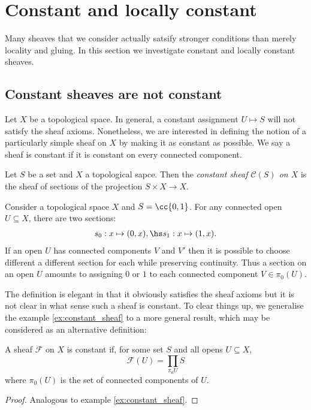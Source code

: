 \documentclass{article}
\begin{document}
\section{Constant and locally constant}\label{sec:locally_constant_sheaves}

Many sheaves that we consider actually satsify stronger conditions
than merely locality and gluing. In this section we investigate constant
and locally constant sheaves.

\subsection{Constant sheaves are not constant}

Let $X$ be a topological space. In general, a constant assignment
$U\mapsto S$ will not satisfy the sheaf axioms. Nonetheless,
we are interested in defining the notion of a particularly simple
sheaf on $X$ by making it as constant as possible. We say a sheaf
is constant if it is constant on every connected component.

\begin{definition}
  Let $S$ be a set and $X$ a topological sapce. Then
  the \emph{constant sheaf $\mathscr C(S)$ on $X$} is the sheaf of sections
  of the projection $S\times X\to X$.
\end{definition}

\begin{example}\label{ex:constant_sheaf}
  Consider a topological space $X$ and $S=\cc{0,1}$. For any
  connected open $U\subseteq X$, there are two sections:
  \begin{align*}
    s_0:x \mapsto(0,x), \hs s_1:x\mapsto(1,x).
  \end{align*}
  If an open $U$ has connected components $V$ and $V'$ then
  it is possible to choose different a different section for each
  while preserving continuity. Thus a section on an open $U$ amounts
  to assigning $0$ or $1$ to each connected component $V\in\pi_0(U)$.
\end{example}

The definition is elegant in that it obviously satisfies the sheaf
axioms but it is not clear in what sense such a sheaf is constant.
To clear things up, we generalise the example \ref{ex:constant_sheaf}
to a more general result, which may be considered as an alternative
definition:

\begin{proposition}
  A sheaf $\mathscr F$ on $X$ is constant if, for some set $S$ and all opens $U\subseteq X$,
  \begin{equation}
    \mathscr F(U) = \prod_{\pi_0U}S
  \end{equation}
  where $\pi_0(U)$ is the set of connected components of $U$.
  \begin{proof}
    Analogous to example \ref{ex:constant_sheaf}.
  \end{proof}
\end{proposition}
\end{document}
